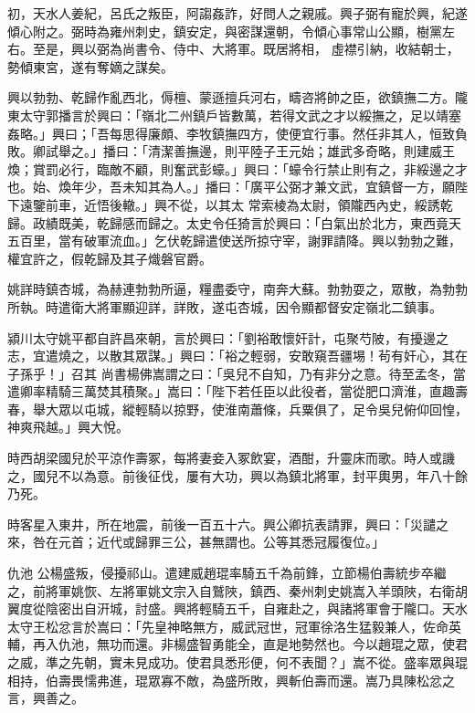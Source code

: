 \begin{pinyinscope}
 初，天水人姜紀，呂氏之叛臣，阿謅姦詐，好問人之親戚。興子弼有寵於興，紀遂傾心附之。弼時為雍州刺史，鎮安定，與密謀還朝，令傾心事常山公顯，樹黨左右。至是，興以弼為尚書令、侍中、大將軍。既居將相，
 虛襟引納，收結朝士，勢傾東宮，遂有奪嫡之謀矣。



 興以勃勃、乾歸作亂西北，傉檀、蒙遜擅兵河右，疇咨將帥之臣，欲鎮撫二方。隴東太守郭播言於興曰：「嶺北二州鎮戶皆數萬，若得文武之才以綏撫之，足以靖塞姦略。」興曰；「吾每思得廉頗、李牧鎮撫四方，使便宜行事。然任非其人，恒致負敗。卿試舉之。」播曰：「清潔善撫邊，則平陸子王元始；雄武多奇略，則建威王煥；賞罰必行，臨敵不顧，則奮武彭蠔。」興曰：「蠔令行禁止則有之，非綏邊之才也。始、煥年少，吾未知其為人。」播曰：「廣平公弼才兼文武，宜鎮督一方，願陛下遠鑒前車，近悟後轍。」興不從，以其太
 常索棱為太尉，領隴西內史，綏誘乾歸。政績既美，乾歸感而歸之。太史令任猗言於興曰：「白氣出於北方，東西竟天五百里，當有破軍流血。」乞伏乾歸遣使送所掠守宰，謝罪請降。興以勃勃之難，權宜許之，假乾歸及其子熾磐官爵。



 姚詳時鎮杏城，為赫連勃勃所逼，糧盡委守，南奔大蘇。勃勃耍之，眾散，為勃勃所執。時遣衛大將軍顯迎詳，詳敗，遂屯杏城，因令顯都督安定嶺北二鎮事。



 潁川太守姚平都自許昌來朝，言於興曰：「劉裕敢懷奸計，屯聚芍陂，有擾邊之志，宜遣燒之，以散其眾謀。」興曰：「裕之輕弱，安敢窺吾疆埸！茍有奸心，其在子孫乎！」召其
 尚書楊佛嵩謂之曰：「吳兒不自知，乃有非分之意。待至孟冬，當遣卿率精騎三萬焚其積聚。」嵩曰：「陛下若任臣以此役者，當從肥口濟淮，直趣壽春，舉大眾以屯城，縱輕騎以掠野，使淮南蕭條，兵粟俱了，足令吳兒俯仰回惶，神爽飛越。」興大悅。



 時西胡梁國兒於平涼作壽冢，每將妻妾入冢飲宴，酒酣，升靈床而歌。時人或譏之，國兒不以為意。前後征伐，屢有大功，興以為鎮北將軍，封平輿男，年八十餘乃死。



 時客星入東井，所在地震，前後一百五十六。興公卿抗表請罪，興曰：「災譴之來，咎在元首；近代或歸罪三公，甚無謂也。公等其悉冠履復位。」



 仇池
 公楊盛叛，侵擾祁山。遣建威趙琨率騎五千為前鋒，立節楊伯壽統步卒繼之，前將軍姚恢、左將軍姚文宗入自鷲陜，鎮西、秦州刺史姚嵩入羊頭陜，右衛胡翼度從陰密出自汧城，討盛。興將輕騎五千，自雍赴之，與諸將軍會于隴口。天水太守王松忿言於嵩曰：「先皇神略無方，威武冠世，冠軍徐洛生猛毅兼人，佐命英輔，再入仇池，無功而還。非楊盛智勇能全，直是地勢然也。今以趙琨之眾，使君之威，準之先朝，實未見成功。使君具悉形便，何不表聞？」嵩不從。盛率眾與琨相持，伯壽畏懦弗進，琨眾寡不敵，為盛所敗，興斬伯壽而還。嵩乃具陳松忿之
 言，興善之。




\end{pinyinscope}
